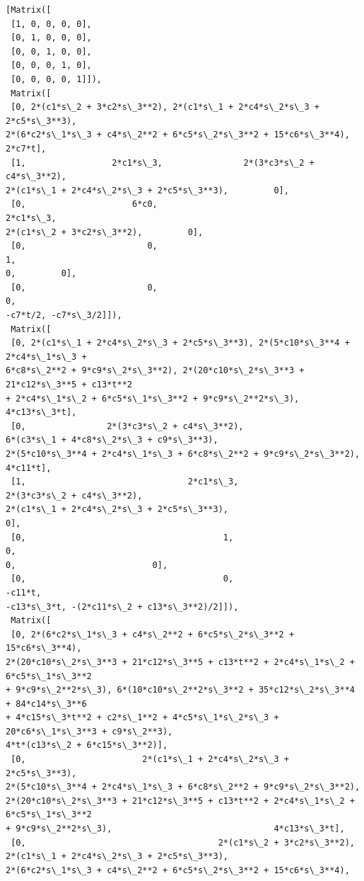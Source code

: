 \documentclass[11pt]{article}
\makeatletter
\newcommand{\boxspacing}{\kern\kvtcb@left@rule\kern\kvtcb@boxsep}
\newcommand{\prompt}[4]{
        {\ttfamily\llap{{\color{#2}[#3]:\hspace{3pt}#4}}\vspace{-\baselineskip}}
    }
\makeatother
\begin{document}
            \begin{tcolorbox}[breakable, size=fbox, boxrule=.5pt, pad at break*=1mm, opacityfill=0]
\prompt{Out}{outcolor}{9}{\boxspacing}
\begin{Verbatim}[commandchars=\\\{\}]
[Matrix([
 [1, 0, 0, 0, 0],
 [0, 1, 0, 0, 0],
 [0, 0, 1, 0, 0],
 [0, 0, 0, 1, 0],
 [0, 0, 0, 0, 1]]),
 Matrix([
 [0, 2*(c1*s\_2 + 3*c2*s\_3**2), 2*(c1*s\_1 + 2*c4*s\_2*s\_3 + 2*c5*s\_3**3),
2*(6*c2*s\_1*s\_3 + c4*s\_2**2 + 6*c5*s\_2*s\_3**2 + 15*c6*s\_3**4),    2*c7*t],
 [1,                 2*c1*s\_3,                2*(3*c3*s\_2 + c4*s\_3**2),
2*(c1*s\_1 + 2*c4*s\_2*s\_3 + 2*c5*s\_3**3),         0],
 [0,                     6*c0,                                2*c1*s\_3,
2*(c1*s\_2 + 3*c2*s\_3**2),         0],
 [0,                        0,                                       1,
0,         0],
 [0,                        0,                                       0,
-c7*t/2, -c7*s\_3/2]]),
 Matrix([
 [0, 2*(c1*s\_1 + 2*c4*s\_2*s\_3 + 2*c5*s\_3**3), 2*(5*c10*s\_3**4 + 2*c4*s\_1*s\_3 +
6*c8*s\_2**2 + 9*c9*s\_2*s\_3**2), 2*(20*c10*s\_2*s\_3**3 + 21*c12*s\_3**5 + c13*t**2
+ 2*c4*s\_1*s\_2 + 6*c5*s\_1*s\_3**2 + 9*c9*s\_2**2*s\_3),
4*c13*s\_3*t],
 [0,                2*(3*c3*s\_2 + c4*s\_3**2),
6*(c3*s\_1 + 4*c8*s\_2*s\_3 + c9*s\_3**3),
2*(5*c10*s\_3**4 + 2*c4*s\_1*s\_3 + 6*c8*s\_2**2 + 9*c9*s\_2*s\_3**2),
4*c11*t],
 [1,                                2*c1*s\_3,
2*(3*c3*s\_2 + c4*s\_3**2),
2*(c1*s\_1 + 2*c4*s\_2*s\_3 + 2*c5*s\_3**3),                           0],
 [0,                                       1,
0,
0,                           0],
 [0,                                       0,
-c11*t,
-c13*s\_3*t, -(2*c11*s\_2 + c13*s\_3**2)/2]]),
 Matrix([
 [0, 2*(6*c2*s\_1*s\_3 + c4*s\_2**2 + 6*c5*s\_2*s\_3**2 + 15*c6*s\_3**4),
2*(20*c10*s\_2*s\_3**3 + 21*c12*s\_3**5 + c13*t**2 + 2*c4*s\_1*s\_2 + 6*c5*s\_1*s\_3**2
+ 9*c9*s\_2**2*s\_3), 6*(10*c10*s\_2**2*s\_3**2 + 35*c12*s\_2*s\_3**4 + 84*c14*s\_3**6
+ 4*c15*s\_3*t**2 + c2*s\_1**2 + 4*c5*s\_1*s\_2*s\_3 + 20*c6*s\_1*s\_3**3 + c9*s\_2**3),
4*t*(c13*s\_2 + 6*c15*s\_3**2)],
 [0,                       2*(c1*s\_1 + 2*c4*s\_2*s\_3 + 2*c5*s\_3**3),
2*(5*c10*s\_3**4 + 2*c4*s\_1*s\_3 + 6*c8*s\_2**2 + 9*c9*s\_2*s\_3**2),
2*(20*c10*s\_2*s\_3**3 + 21*c12*s\_3**5 + c13*t**2 + 2*c4*s\_1*s\_2 + 6*c5*s\_1*s\_3**2
+ 9*c9*s\_2**2*s\_3),                                4*c13*s\_3*t],
 [0,                                      2*(c1*s\_2 + 3*c2*s\_3**2),
2*(c1*s\_1 + 2*c4*s\_2*s\_3 + 2*c5*s\_3**3),
2*(6*c2*s\_1*s\_3 + c4*s\_2**2 + 6*c5*s\_2*s\_3**2 + 15*c6*s\_3**4),

\end{Verbatim}
\end{tcolorbox}
\end{document}
